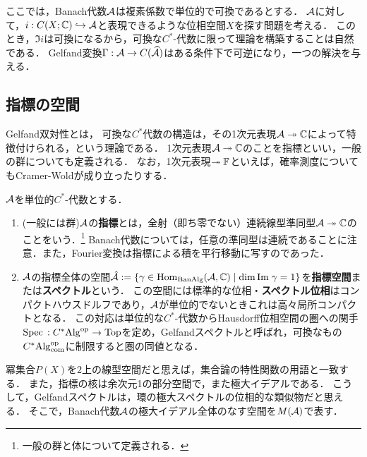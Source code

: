 \documentclass[uplatex,dvipdfmx]{jsreport}
\begin{document}
\begin{tcolorbox}[colframe=ForestGreen, colback=ForestGreen!10!white,breakable,colbacktitle=ForestGreen!40!white,coltitle=black,fonttitle=\bfseries\sffamily,
title=]
    ここでは，Banach代数$\mathcal{A}$は複素係数で単位的で可換であるとする．
    $\mathcal{A}$に対して，$i:C(X;\mathbb{C})\hookrightarrow\mathcal{A}$と表現できるような位相空間$X$を探す問題を考える．
    このとき，$\Im i$は可換になるから，可換な$C^*$-代数に限って理論を構築することは自然である．
    Gelfand変換$\Gamma:\mathcal{A}\to C(\widehat{\mathcal{A}})$はある条件下で可逆になり，一つの解決を与える．
\end{tcolorbox}

\subsection{指標の空間}

\begin{tcolorbox}[colframe=ForestGreen, colback=ForestGreen!10!white,breakable,colbacktitle=ForestGreen!40!white,coltitle=black,fonttitle=\bfseries\sffamily,
title=]
    Gelfand双対性とは，
    可換な$C^*$代数の構造は，その1次元表現$\mathcal{A}\twoheadrightarrow\mathbb{C}$によって特徴付けられる，という理論である．
    1次元表現$\mathcal{A}\twoheadrightarrow\mathbb{C}$のことを指標といい，一般の群についても定義される．
    なお，1次元表現$\twoheadrightarrow\mathbb{F}$といえば，確率測度についてもCramer-Woldが成り立ったりする．
\end{tcolorbox}

\begin{definition}\label{def-character}
    $\mathcal{A}$を単位的$C^*$-代数とする．
    \begin{enumerate}
        \item (一般には群)$\mathcal{A}$の\textbf{指標}とは，全射（即ち零でない）連続線型準同型$\mathcal{A}\twoheadrightarrow\mathbb{C}$のことをいう．\footnote{一般の群と体について定義される．}
        Banach代数については，任意の準同型は連続であることに注意．また，Fourier変換は指標による積を平行移動に写すのであった．
        \item $\mathcal{A}$の指標全体の空間$\hat{\mathcal{A}}:=\left\{\gamma\in\mathrm{Hom}_{\mathrm{Ban}\mathrm{Alg}}(\mathcal{A},\mathbb{C})\mid\dim\mathrm{Im}\;\gamma=1\right\}$を\textbf{指標空間}または\textbf{スペクトル}という．
        この空間には標準的な位相・\textbf{スペクトル位相}はコンパクトハウスドルフであり，$\mathcal{A}$が単位的でないときこれは高々局所コンパクトとなる．
        この対応は単位的な$C^*$-代数からHausdorff位相空間の圏への関手$\mathrm{Spec}\,:C^*\mathrm{Alg}^{\mathrm{op}}\to\mathrm{Top}$を定め，Gelfandスペクトルと呼ばれ，可換なもの$C^*\mathrm{Alg}^{\mathrm{op}}_{\mathrm{com}}$に制限すると圏の同値となる．
    \end{enumerate}
\end{definition}
\begin{remark}[他の数学的対象との関係]
    冪集合$P(X)$を$2$上の線型空間だと思えば，集合論の特性関数の用語と一致する．
    また，指標の核は余次元1の部分空間で，また極大イデアルである．
    こうして，Gelfandスペクトルは，環の極大スペクトルの位相的な類似物だと思える．
    そこで，Banach代数$\mathcal{A}$の極大イデアル全体のなす空間を$M(\mathcal{A})$で表す．
\end{remark}
\end{document}
